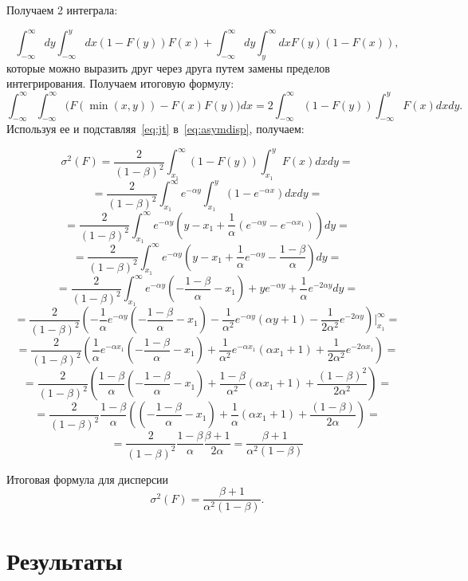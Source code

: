 \documentclass[12pt, specialist, subf, substylefile = spbu.rtx]{disser}
\begin{document}
Получаем 2 интеграла:

$$
\int_{-\infty}^\infty dy \int_{-\infty}^y dx (1-F(y))F(x) + 
\int_{-\infty}^\infty dy \int_y^\infty dx F(y)(1-F(x)),
$$
которые можно выразить друг через друга путем замены пределов интегрирования. Получаем итоговую формулу:
$$
\int_{-\infty}^\infty \int_{-\infty}^\infty 
\big( F(\min(x, y))-F(x)F(y)\big)dx = 
2\int_{-\infty}^\infty (1-F(y)) \int_{-\infty}^y F(x) dx dy.
$$
Используя ее и подставляя~\eqref{eq:jt} в~\eqref{eq:asymdisp}, получаем:

$$
\sigma^2(F)=\frac{2}{(1-\beta)^2}
\int_{x_1}^\infty
(1-F(y))\int_{x_1}^y F(x)dx dy =
$$
$$
=\frac{2}{(1-\beta)^2}
\int_{x_1}^\infty
e^{-\alpha y}\int_{x_1}^y (1-e^{-\alpha x})dx dy =
$$
$$
=\frac{2}{(1-\beta)^2} \int_{x_1}^\infty e^{-\alpha y}
(y-x_1+\frac{1}{\alpha}(e^{-\alpha y}-
e^{-\alpha x_1})) dy =
$$
$$
=\frac{2}{(1-\beta)^2} \int_{x_1}^\infty e^{-\alpha y}
(y-x_1+\frac{1}{\alpha}e^{-\alpha y}-
\frac{1-\beta}{\alpha}) dy =
$$
$$
=\frac{2}{(1-\beta)^2} \int_{x_1}^\infty 
e^{-\alpha y}(-\frac{1-\beta}{\alpha}-x_1)
+ ye^{-\alpha y}
+\frac{1}{\alpha}e^{-2\alpha y}dy =
$$
$$
=\frac{2}{(1-\beta)^2} \left(
-\frac{1}{\alpha}e^{-\alpha y}(-\frac{1-\beta}{\alpha}-x_1)
-\frac{1}{\alpha^2}e^{-\alpha y}(\alpha y + 1)
-\frac{1}{2\alpha^2}e^{-2\alpha y}
\right)|_{x_1}^\infty =
$$
$$
=\frac{2}{(1-\beta)^2} \left(
\frac{1}{\alpha}e^{-\alpha x_1}(-\frac{1-\beta}{\alpha}-x_1)
+\frac{1}{\alpha^2}e^{-\alpha x_1}(\alpha x_1 + 1)
+\frac{1}{2\alpha^2}e^{-2\alpha x_1}
\right) =
$$
$$
=\frac{2}{(1-\beta)^2} \left(
\frac{1-\beta}{\alpha}(-\frac{1-\beta}{\alpha}-x_1)
+\frac{1-\beta}{\alpha^2}(\alpha x_1 + 1)
+\frac{(1-\beta)^2}{2\alpha^2} \right) =
$$
$$
=\frac{2}{(1-\beta)^2} \frac{1-\beta}{\alpha} \left(
(-\frac{1-\beta}{\alpha}-x_1)
+\frac{1}{\alpha}(\alpha x_1 + 1)
+\frac{(1-\beta)}{2\alpha} \right) =
$$
$$
=\frac{2}{(1-\beta)^2} \frac{1-\beta}{\alpha} \frac{\beta + 1}{2\alpha} =\frac{\beta + 1}{\alpha^2(1-\beta)}
$$

Итоговая формула для дисперсии
\begin{equation}\label{eq:sigma_res}
\sigma^2(F)= \frac{\beta + 1}{\alpha^2(1-\beta)}.
\end{equation}

\chapter{Результаты}
\end{document}
